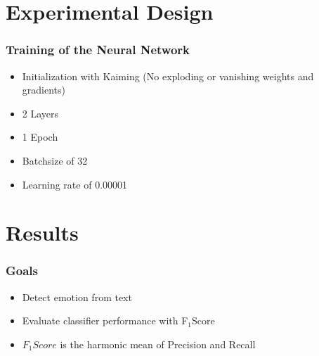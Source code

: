 \documentclass[aspectratio=169]{beamer}
\begin{document}






\section{Experimental Design}
\begin{frame}
\frametitle{Training of the Neural Network}

\begin{itemize}

\item Initialization with Kaiming (No exploding or vanishing weights and gradients)
\item 2 Layers
\item 1 Epoch
\item Batchsize of 32
\item Learning rate of 0.00001

\end{itemize}

\end{frame}

\section{Results}
\begin{frame}
\frametitle{Goals}
\begin{itemize}
\item Detect emotion from text
\item Evaluate classifier performance with F$_1$Score
\item $F_1Score$ is the harmonic mean of Precision and Recall


\end{itemize}
\end{frame}
\end{document}
